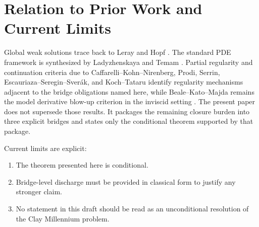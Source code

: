 \section{Relation to Prior Work and Current Limits}

Global weak solutions trace back to Leray and Hopf \cite{Leray1934,Hopf1951}. The standard PDE framework is synthesized by Ladyzhenskaya and Temam \cite{Ladyzhenskaya1969,Temam2001}. Partial regularity and continuation criteria due to Caffarelli--Kohn--Nirenberg, Prodi, Serrin, Escauriaza--Seregin--Sver\'ak, and Koch--Tataru identify regularity mechanisms adjacent to the bridge obligations named here, while Beale--Kato--Majda remains the model derivative blow-up criterion in the inviscid setting \cite{CaffarelliKohnNirenberg1982,Prodi1959,Serrin1962,EscauriazaSereginSverak2003,KochTataru2001,BealeKatoMajda1984}. The present paper does not supersede those results. It packages the remaining closure burden into three explicit bridges and states only the conditional theorem supported by that package.

Current limits are explicit:
\begin{enumerate}[leftmargin=*]
\item The theorem presented here is conditional.
\item Bridge-level discharge must be provided in classical form to justify any stronger claim.
\item No statement in this draft should be read as an unconditional resolution of the Clay Millennium problem.
\end{enumerate}
